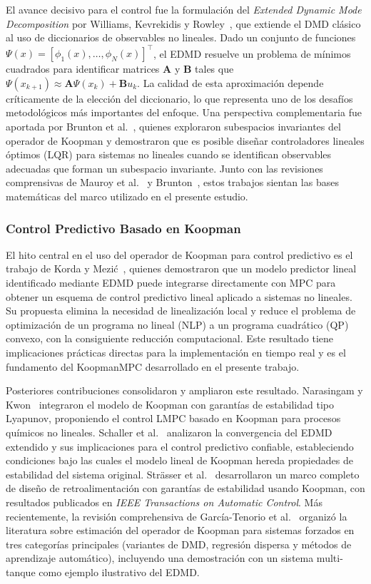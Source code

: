 \documentclass[12pt,letterpaper]{article}
\begin{document}
El avance decisivo para el control fue la formulación del \emph{Extended Dynamic Mode
Decomposition} por Williams, Kevrekidis y Rowley~\cite{williams2015}, que
extiende el DMD clásico al uso de diccionarios de observables no lineales. Dado un
conjunto de funciones $\Psi(x) = [\phi_1(x), \ldots, \phi_N(x)]^\top$, el EDMD
resuelve un problema de mínimos cuadrados para identificar matrices $\mathbf{A}$ y
$\mathbf{B}$ tales que $\Psi(x_{k+1}) \approx \mathbf{A}\Psi(x_k) + \mathbf{B}u_k$. La
calidad de esta aproximación depende críticamente de la elección del diccionario, lo
que representa uno de los desafíos metodológicos más importantes del enfoque. Una
perspectiva complementaria fue aportada por Brunton et al.~\cite{brunton2016},
quienes exploraron subespacios invariantes del operador de Koopman y demostraron que
es posible diseñar controladores lineales óptimos (LQR) para sistemas no lineales
cuando se identifican observables adecuadas que forman un subespacio invariante.
Junto con las revisiones comprensivas de Mauroy et al.~\cite{mauroy2020} y
Brunton~\cite{brunton2022}, estos trabajos sientan las bases matemáticas del marco
utilizado en el presente estudio.

\subsubsection*{Control Predictivo Basado en Koopman}

El hito central en el uso del operador de Koopman para control predictivo es el
trabajo de Korda y Mezi\'c~\cite{korda2018}, quienes demostraron que un modelo
predictor lineal identificado mediante EDMD puede integrarse directamente con MPC
para obtener un esquema de control predictivo lineal aplicado a sistemas no lineales.
Su propuesta elimina la necesidad de linealización local y reduce el problema de
optimización de un programa no lineal (NLP) a un programa cuadrático (QP) convexo,
con la consiguiente reducción computacional. Este resultado tiene implicaciones
prácticas directas para la implementación en tiempo real y es el fundamento del
KoopmanMPC desarrollado en el presente trabajo.

Posteriores contribuciones consolidaron y ampliaron este resultado.
Narasingam y Kwon~\cite{narasingam2019} integraron el modelo de Koopman con garantías
de estabilidad tipo Lyapunov, proponiendo el control LMPC basado en Koopman para
procesos químicos no lineales. Schaller et al.~\cite{schaller2023} analizaron la
convergencia del EDMD extendido y sus implicaciones para el control predictivo
confiable, estableciendo condiciones bajo las cuales el modelo lineal de Koopman
hereda propiedades de estabilidad del sistema original. Strässer et
al.~\cite{strasser2025} desarrollaron un marco completo de diseño de
retroalimentación con garantías de estabilidad usando Koopman, con resultados
publicados en \textit{IEEE Transactions on Automatic Control}. Más recientemente, la
revisión comprehensiva de García-Tenorio et al.~\cite{garciarev2025} organizó la
literatura sobre estimación del operador de Koopman para sistemas forzados en tres
categorías principales (variantes de DMD, regresión dispersa y métodos de aprendizaje
automático), incluyendo una demostración con un sistema multi-tanque como ejemplo
ilustrativo del EDMD.
\end{document}
